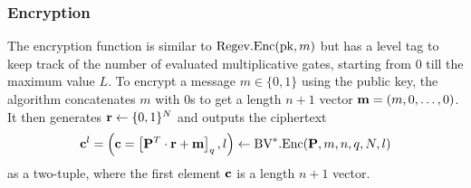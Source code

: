 \documentclass[../main.tex]{subfiles}
\begin{document}
\subsubsection*{Encryption} 
The encryption function is similar to $\text{Regev}.\text{Enc}(\text{pk},m)$ but has a level tag to keep track of the number of evaluated multiplicative gates, starting from 0 till the maximum value $L$. 
To encrypt a message $m \in \{0,1\}$ using the public key, the algorithm concatenates $m$ with 0s to get a length $n+1$ vector $\mathbf{m}=(m, 0, \dots, 0)$. It then generates $\mathbf{r} \leftarrow \{0,1\}^N$ and outputs the ciphertext
\begin{align*}
    \vc{c}^l=\bracket{\vc{c}=\sqbracket{\vc{P}^T \cdot \vc{r}+ \vc{m}}_q, l} \leftarrow \bvv.\enc(\vc{P}, m,n,q,N,l) %
\end{align*}
as a two-tuple, where the first element  $\mathbf{c}$ is a length $n+1$ vector. %

 
\end{document}
